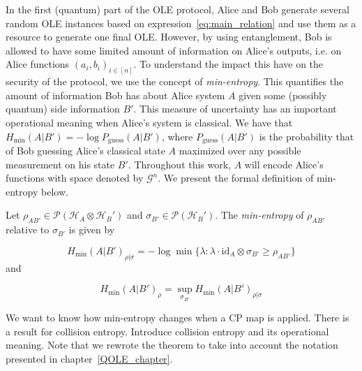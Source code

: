 In the first (quantum) part of the OLE protocol, Alice and Bob generate several random OLE instances based on expression~\eqref{eq:main_relation} and use them as a resource to generate one final OLE. However, by using entanglement, Bob is allowed to have some limited amount of information on Alice's outputs, i.e. on Alice functions $(a_i, b_i)_{i\in [n]}$. To understand the impact this have on the security of the protocol, we use the concept of \textit{min-entropy}. This quantifies the amount of information Bob has about Alice system $A$ given some (possibly quantum) side information $B'$. This measure of uncertainty has an important operational meaning when Alice's system is classical. We have that $H_{\text{min}}(A|B') = - \log P_{\text{guess}}(A|B')$, where $P_{\text{guess}}(A|B')$ is the probability that of Bob guessing Alice's classical state $A$ maximized over any possible measurement on his state $B'$. Throughout this work, $A$ will encode Alice's functions with space denoted by $\mathcal{G}^n$. We present the formal definition of min-entropy below.

\begin{definition}
Let $\rho_{A B'} \in \mathcal{P}(\mathcal{H}_A \otimes \mathcal{H}_B')$ and $\sigma_{B'} \in \mathcal{P}(\mathcal{H}_B')$. The \textit{min-entropy} of $\rho_{A B'}$ relative to $\sigma_{B'}$ is given by

$$H_{\text{min}}(A | B')_{\rho|\sigma} = -\log \min\{ \lambda : \lambda \cdot \text{id}_A \otimes \sigma_{B'} \geq \rho_{A B'} \}$$
and 

$$ H_{\text{min}}(A | B')_{\rho} = \sup_{\sigma_{B'}} H_{\text{min}}(A | B')_{\rho|\sigma} $$
\end{definition}










We want to know how min-entropy changes when a CP map is applied. There is a result for collision entropy. Introduce collision entropy and its operational meaning. Note that we rewrote the theorem to take into account the notation presented in chapter~\ref{QOLE_chapter}.



